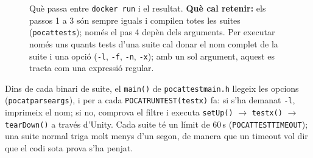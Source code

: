 \documentclass[11pt,a4paper]{article}
\DeclareRobustCommand{\_}{\textunderscore\allowbreak}
\newcommand{\cd}[1]{\texttt{#1}}
\newenvironment{slidefig}{\begin{landscape}\thispagestyle{plain}\begin{figure}[p]\centering}{\end{figure}\end{landscape}}
\begin{document}
\begin{slidefig}
\caption{Què passa entre \cd{docker run} i el resultat. \textbf{Què cal retenir:} els passos 1 a 3 són
sempre iguals i compilen totes les suites (\cd{pocat\_tests}); només el pas 4 depèn dels arguments. Per
executar només uns quants tests d'una suite cal donar el nom complet de la suite i una opció
(\cd{-l}, \cd{-f}, \cd{-n}, \cd{-x}); amb un sol argument, aquest es tracta com una expressió regular.}
\label{fig:flow}
\end{slidefig}

Dins de cada binari de suite, el \cd{main()} de \cd{pocat\_test\_main.h} llegeix les opcions
(\cd{pocat\_parse\_args}), i per a cada \cd{POCAT\_RUN\_TEST(test\_x)} fa: si s'ha demanat
\cd{-l}, imprimeix el nom; si no, comprova el filtre i executa \cd{setUp()} \ensuremath{\rightarrow} \cd{test\_x()} \ensuremath{\rightarrow}
\cd{tearDown()} a través d'Unity. Cada suite té un límit de 60\,s (\cd{POCAT\_TEST\_TIMEOUT});
una suite normal triga molt menys d'un segon, de manera que un timeout vol dir que el codi
sota prova s'ha penjat.
\end{document}
